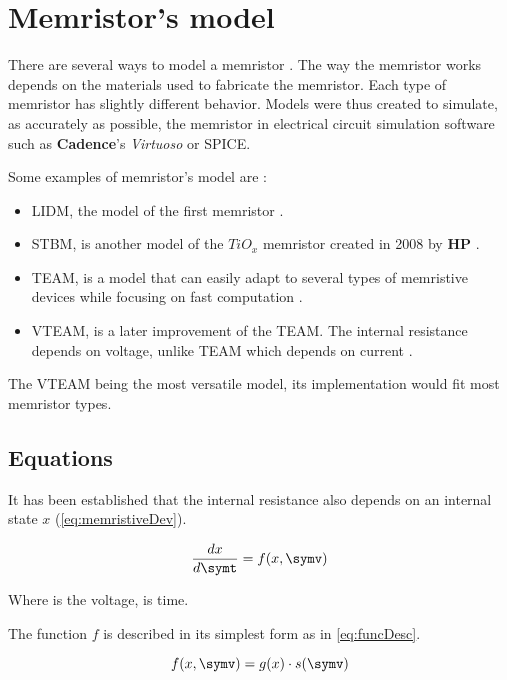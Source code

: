\section{Memristor's model}\label{sec:model}

There are several ways to model a memristor \cite{memristorFab,memTEAMmodel, memVTEAMmodel, memristorSpiceModels}. The way the memristor works depends on the materials used to fabricate the memristor. Each type of memristor has slightly different behavior. Models were thus created to simulate, as accurately as possible, the memristor in electrical circuit simulation software such as \textbf{Cadence}'s \textit{Virtuoso} or SPICE.

Some examples of memristor's model are :

\begin{itemize}
  \item \acf{LIDM}, the model of the first memristor \cite{memristorFab}.
  \item \acf{STBM}, is another model of the $TiO_x$ memristor created in 2008 by \textbf{HP} \cite{memristorFab, memristorSpiceModels}.
  \item \acf{TEAM}, is a model that can easily adapt to several types of memristive devices while focusing on fast computation \cite{memTEAMmodel}.
  \item \acf{VTEAM}, is a later improvement of the \ac{TEAM}. The internal resistance depends on voltage, unlike \ac{TEAM} which depends on current \cite{memVTEAMmodel}.
\end{itemize}

The \ac{VTEAM} being the most versatile model, its implementation would fit most memristor types.

\subsection{Equations}

It has been established that the internal resistance also depends on an internal state $x$ (\cref{eq:memristiveDev}).

\begin{equation}
  \frac{dx}{d\symt}=f(x,\symv)
\end{equation}

Where \symv is the voltage, \symt is time.

The function $f$ is described in its simplest form as in \cref{eq:funcDesc}.

\begin{equation}\label{eq:funcDesc}
  f(x,\symv)=g(x)\cdot s(\symv)
\end{equation}

